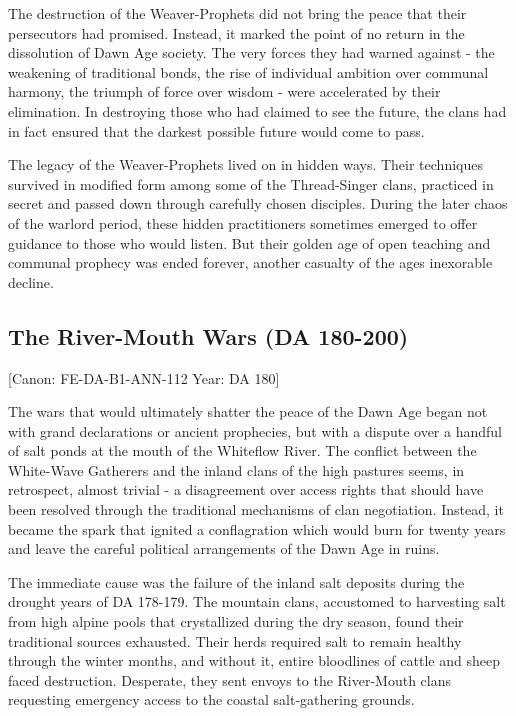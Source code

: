 The destruction of the Weaver-Prophets did not bring the peace that
their persecutors had promised. Instead, it marked the point of no
return in the dissolution of Dawn Age society. The very forces they had
warned against - the weakening of traditional bonds, the rise of
individual ambition over communal harmony, the triumph of force over
wisdom - were accelerated by their elimination. In destroying those who
had claimed to see the future, the clans had in fact ensured that the
darkest possible future would come to pass.

The legacy of the Weaver-Prophets lived on in hidden ways. Their
techniques survived in modified form among some of the Thread-Singer
clans, practiced in secret and passed down through carefully chosen
disciples. During the later chaos of the warlord period, these hidden
practitioners sometimes emerged to offer guidance to those who would
listen. But their golden age of open teaching and communal prophecy was
ended forever, another casualty of the age\textquotesingle s inexorable
decline.

\subsection{The River-Mouth Wars (DA
180-200)}\label{the-river-mouth-wars-da-180-200}

{[}Canon: FE-DA-B1-ANN-112 \textbar{} Year: DA 180{]}

The wars that would ultimately shatter the peace of the Dawn Age began
not with grand declarations or ancient prophecies, but with a dispute
over a handful of salt ponds at the mouth of the Whiteflow River. The
conflict between the White-Wave Gatherers and the inland clans of the
high pastures seems, in retrospect, almost trivial - a disagreement over
access rights that should have been resolved through the traditional
mechanisms of clan negotiation. Instead, it became the spark that
ignited a conflagration which would burn for twenty years and leave the
careful political arrangements of the Dawn Age in ruins.

The immediate cause was the failure of the inland salt deposits during
the drought years of DA 178-179. The mountain clans, accustomed to
harvesting salt from high alpine pools that crystallized during the dry
season, found their traditional sources exhausted. Their herds required
salt to remain healthy through the winter months, and without it, entire
bloodlines of cattle and sheep faced destruction. Desperate, they sent
envoys to the River-Mouth clans requesting emergency access to the
coastal salt-gathering grounds.

